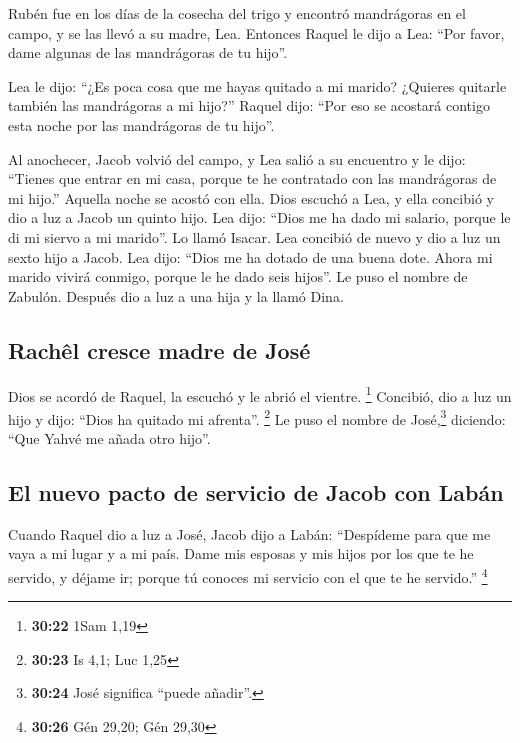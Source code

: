  Rubén fue en los días de la cosecha del trigo y encontró
mandrágoras en el campo, y se las llevó a su madre, Lea. Entonces Raquel
le dijo a Lea: ``Por favor, dame algunas de las mandrágoras de tu
hijo''.

 Lea le dijo: ``¿Es poca cosa que me hayas quitado a mi
marido? ¿Quieres quitarle también las mandrágoras a mi hijo?'' Raquel
dijo: ``Por eso se acostará contigo esta noche por las mandrágoras de tu
hijo''.

 Al anochecer, Jacob volvió del campo, y Lea salió a su
encuentro y le dijo: ``Tienes que entrar en mi casa, porque te he
contratado con las mandrágoras de mi hijo.'' Aquella noche se acostó con
ella.  Dios escuchó a Lea, y ella concibió y dio a luz a
Jacob un quinto hijo.  Lea dijo: ``Dios me ha dado mi
salario, porque le di mi siervo a mi marido''. Lo llamó Isacar.
 Lea concibió de nuevo y dio a luz un sexto hijo a Jacob.
 Lea dijo: ``Dios me ha dotado de una buena dote. Ahora
mi marido vivirá conmigo, porque le he dado seis hijos''. Le puso el
nombre de Zabulón.  Después dio a luz a una hija y la
llamó Dina.

\hypertarget{rachuxeal-cresce-madre-de-josuxe9}{%
\subsection{Rachêl cresce madre de
José}\label{rachuxeal-cresce-madre-de-josuxe9}}

 Dios se acordó de Raquel, la escuchó y le abrió el
vientre. \footnote{\textbf{30:22} 1Sam 1,19}  Concibió,
dio a luz un hijo y dijo: ``Dios ha quitado mi afrenta''. \footnote{\textbf{30:23}
  Is 4,1; Luc 1,25}  Le puso el nombre de
José,\footnote{\textbf{30:24} José significa ``puede añadir''.}
diciendo: ``Que Yahvé me añada otro hijo''.

\hypertarget{el-nuevo-pacto-de-servicio-de-jacob-con-labuxe1n}{%
\subsection{El nuevo pacto de servicio de Jacob con
Labán}\label{el-nuevo-pacto-de-servicio-de-jacob-con-labuxe1n}}

 Cuando Raquel dio a luz a José, Jacob dijo a Labán:
``Despídeme para que me vaya a mi lugar y a mi país. 
Dame mis esposas y mis hijos por los que te he servido, y déjame ir;
porque tú conoces mi servicio con el que te he servido.'' \footnote{\textbf{30:26}
  Gén 29,20; Gén 29,30}

